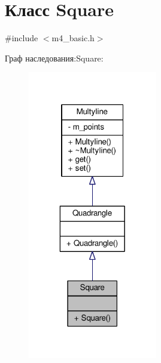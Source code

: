 \hypertarget{class_square}{\section{Класс Square}
\label{class_square}
}


{\ttfamily \#include $<$m4\-\_\-basic.\-h$>$}



Граф наследования\-:Square\-:
\nopagebreak
\begin{figure}[H]
\begin{center}
\leavevmode
\includegraphics[width=160pt]{class_square__inherit__graph}
\end{center}
\end{figure}


